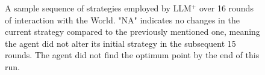 \begin{figure}[th!]
    \vspace{-2em} 
    \caption{A sample sequence of strategies employed by LLM$^+$ over 16 rounds of interaction with the World. "NA" indicates no changes in the current strategy compared to the previously mentioned one, meaning the agent did not alter its initial strategy in the subsequent 15 rounds. The agent did not find the optimum point by the end of this run.}
    \label{fig:llm+:sample1}
\end{figure}

